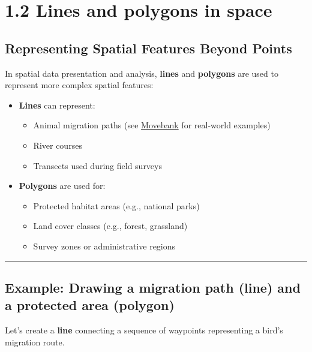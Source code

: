 \documentclass[
]{book}
\providecommand{\tightlist}{%
  \setlength{\itemsep}{0pt}\setlength{\parskip}{0pt}}
\begin{document}
\section{1.2 Lines and polygons in
space}\label{lines-and-polygons-in-space}

\subsection{Representing Spatial Features Beyond
Points}\label{representing-spatial-features-beyond-points}

In spatial data presentation and analysis, \textbf{lines} and
\textbf{polygons} are used to represent more complex spatial features:

\begin{itemize}
\tightlist
\item
  \textbf{Lines} can represent:

  \begin{itemize}
  \tightlist
  \item
    Animal migration paths (see
    \href{https://www.movebank.org/cms/movebank-main}{Movebank} for
    real-world examples)
  \item
    River courses
  \item
    Transects used during field surveys
  \end{itemize}
\item
  \textbf{Polygons} are used for:

  \begin{itemize}
  \tightlist
  \item
    Protected habitat areas (e.g., national parks)
  \item
    Land cover classes (e.g., forest, grassland)
  \item
    Survey zones or administrative regions
  \end{itemize}
\end{itemize}

\begin{center}\rule{0.5\linewidth}{0.5pt}\end{center}

\subsection{Example: Drawing a migration path (line) and a protected
area
(polygon)}\label{example-drawing-a-migration-path-line-and-a-protected-area-polygon}

Let's create a \textbf{line} connecting a sequence of waypoints
representing a bird's migration route.
\end{document}
